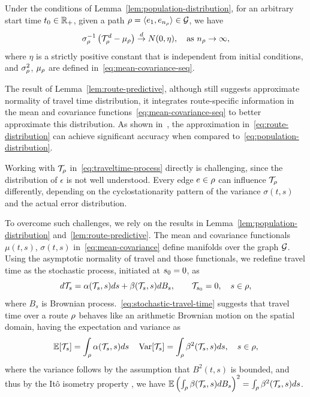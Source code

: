 \documentclass[12pt]{article}
\begin{document}
{{{{{\begin{lemma} \label{lem:route-predictive} Under the conditions of Lemma~\ref{lem:population-distribution}, for an arbitrary start time $t_0 \in \mathbb{R}_+$, given a path $\rho={\langle e_1,e_{n_\rho}\rangle } \in \mathcal{G}$, we have 
\begin{equation}\label{eq:route-distribution}
    \sigma^{-1}_{\rho} \left(\mathcal{T}^d_\rho - \mu_\rho\right) \stackrel{d}{\to} N(0, \eta), \quad \text{as  } n_\rho \to \infty,
\end{equation}
where $\eta$ is a strictly positive constant that is independent from initial conditions, and $\sigma^2_\rho $, $\mu_\rho$ are defined in~\eqref{eq:mean-covariance-seq}. 
\end{lemma}

The result of Lemma~\ref{lem:route-predictive}, although still suggests approximate normality of travel time distribution, it integrates route-specific information in the mean and covariance functions~\eqref{eq:mean-covariance-seq} to better approximate this distribution. As shown in~\citet[Fig.~3]{elmasri2020predictive}, the approximation in~\eqref{eq:route-distribution} can achieve significant accuracy when compared to~\eqref{eq:population-distribution}. 

Working with $\mathcal{T}_\rho$ in~\eqref{eq:traveltime-process} directly is challenging, since the distribution of $\epsilon$ is not well understood. Every edge $e \in \rho$ can influence $\mathcal{T}_\rho$ differently, depending on the cyclostationarity pattern of the variance $\sigma(t,s)$ and the actual error distribution. 

To overcome such challenges, we rely on the results in Lemma~\ref{lem:population-distribution} and~\ref{lem:route-predictive}. The mean and covariance functionals $\mu(t,s)$, $\sigma(t,s)$ in~\eqref{eq:mean-covariance} define manifolds over the graph $\mathcal{G}$. Using the asymptotic normality of travel and those functionals, we redefine travel time as the stochastic process, initiated at ${s_0}=0$, as
\begin{equation}\label{eq:stochastic-travel-time}
    d\mathcal{T}_{s} = \alpha(\mathcal{T}_{s}, s)ds+ \beta(\mathcal{T}_{s}, s)dB_s,\qquad \mathcal{T}_{{s_0}} = 0,   \quad s \in \rho,
\end{equation}
where $B_s$ is Brownian process.~\eqref{eq:stochastic-travel-time} suggests that travel time over a route $\rho$ behaves like an arithmetic Brownian motion on the spatial domain, having the expectation and variance as 
\[\mathbb{E}[\mathcal{T}_s] = \int_\rho \alpha(\mathcal{T}_s,s)ds \quad \operatorname{{\rm Var}}[\mathcal{T}_s]  = \int_\rho \beta^2(\mathcal{T}_s, s)ds, \quad s \in \rho,\]
where the variance follows by the assumption that $B^2(t,s)$ is bounded, and thus by the Itô isometry property \citet[Lem.~3.1.5]{oksendal2013stochastic}, we have $\mathbb{E}\left(\int_\rho \beta(\mathcal{T}_s, s)dB_s\right)^2 = \int_\rho \beta^2(\mathcal{T}_s,s)ds$. 

}}}}}
\end{document}
